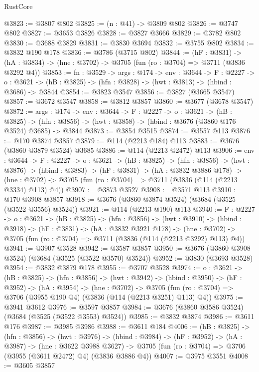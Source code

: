 \begin{lexlean}{RustCore}
\begin{coremodule}
@3823 := @3807 @802
@3825 := (n : @41) -> @3809 @802
@3826 := @3747 @802
@3827 := @3653 @3826
@3828 := @3827 @3666
@3829 := @3782 @802
@3830 := @3688 @3829
@3831 := @3830 @3694
@3832 := @3755 @802
@3834 := @3832 @190 @178
@3836 := @3786 (@3715 @802)
@3844 := (hF : @3831) ->
  (hA : @3834) -> (hne : @3702) -> @3705 (fun (ro : @3704) => @3711 (@3836 @3292 @4))
@3853 := {fn : @3529} ->
  {args : @174} ->
  {env : @3644} ->
  {F : @2227} ->
  {o : @3621} -> (hB : @3825) -> (hfn : @3828) -> (hwt : @3813) -> (hbind : @3686) -> @3844
@3854 := @3823 @3547
@3856 := @3827 (@3665 @3547)
@3857 := @3672 @3547
@3858 := @3812 @3857
@3860 := @3677 (@3678 @3547)
@3872 := {args : @174} ->
  {env : @3644} ->
  {F : @2227} ->
  {o : @3621} ->
  (hB : @3825) ->
  (hfn : @3856) -> (hwt : @3858) -> (hbind : @3676 (@3860 @176 @3524) @3685) -> @3844
@3873 := @3854 @3515
@3874 := @3557 @113
@3876 := @170 @3874 @3857
@3879 := @114 (@2213 @184) @113
@3883 := @3676 (@3860 @3879 @3524) @3685
@3886 := @114 (@2213 @2472) @113
@3906 := {env : @3644} ->
  {F : @2227} ->
  {o : @3621} ->
  (hB : @3825) ->
  (hfn : @3856) ->
  (hwt : @3876) ->
  (hbind : @3883) ->
  (hF : @3831) ->
  (hA : @3832 @3886 @178) ->
  (hne : @3702) -> @3705 (fun (ro : @3704) => @3711 (@3836 (@114 (@2213 @3334) @113) @4))
@3907 := @3873 @3527
@3908 := @3571 @113
@3910 := @170 @3908 @3857
@3918 := @3676 (@3860 @3874 @3524) (@3684 (@3525 (@3522 @3556) @3524))
@3921 := @114 (@2213 @190) @113
@3940 := {F : @2227} ->
  {o : @3621} ->
  (hB : @3825) ->
  (hfn : @3856) ->
  (hwt : @3910) ->
  (hbind : @3918) ->
  (hF : @3831) ->
  (hA : @3832 @3921 @178) ->
  (hne : @3702) -> @3705 (fun (ro : @3704) => @3711 (@3836 (@114 (@2213 @3292) @113) @4))
@3941 := @3907 @3528
@3942 := @3587 @3857
@3950 := @3676 (@3860 @3908 @3524) (@3684 (@3525 (@3522 @3570) @3524))
@3952 := @3830 (@3693 @3528)
@3954 := @3832 @3879 @178
@3955 := @3707 @3528
@3974 := {o : @3621} ->
  (hB : @3825) ->
  (hfn : @3856) ->
  (hwt : @3942) ->
  (hbind : @3950) ->
  (hF : @3952) ->
  (hA : @3954) ->
  (hne : @3702) ->
  @3705 (fun (ro : @3704) => @3706 (@3955 @190 @4) (@3836 (@114 (@2213 @3251) @113) @4))
@3975 := @3941 @3612
@3976 := @3597 @3857
@3984 := @3676 (@3860 @3586 @3524) (@3684 (@3525 (@3522 @3553) @3524))
@3985 := @3832 @3874
@3986 := @3611 @176
@3987 := @3985 @3986
@3988 := @3611 @184
@4006 := (hB : @3825) ->
  (hfn : @3856) ->
  (hwt : @3976) ->
  (hbind : @3984) ->
  (hF : @3952) ->
  (hA : @3987) ->
  (hne : @3622 @3988 @3627) ->
  @3705 (fun (ro : @3704) => @3706 (@3955 (@3611 @2472) @4) (@3836 @3886 @4))
@4007 := @3975 @3551
@4008 := @3605 @3857

\end{coremodule}
\end{lexlean}
